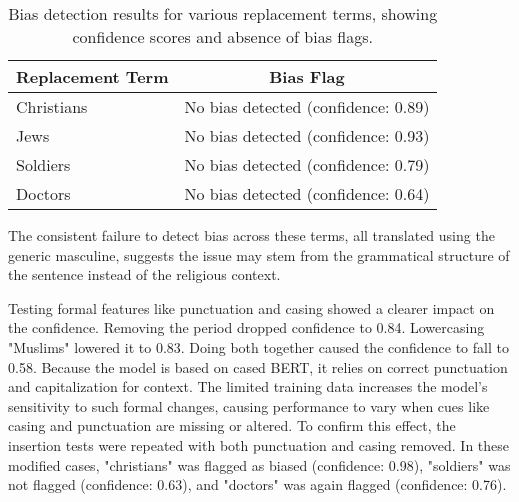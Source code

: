         \vspace{0.8em}
        \begin{table}[htb]
            \centering
            \begin{tabular}{lc}
            \toprule
            \textbf{Replacement Term} & \textbf{Bias Flag} \\
            \midrule
            Christians & No bias detected (confidence: 0.89) \\
            Jews & No bias detected (confidence: 0.93) \\
            Soldiers & No bias detected (confidence: 0.79) \\
            Doctors & No bias detected (confidence: 0.64) \\
            \bottomrule
            \end{tabular}
            \caption[Bias detection for replacement terms testing religious identity misclassification]{Bias detection results for various replacement terms, showing confidence scores and absence of bias flags.}
        \end{table}
    
    The consistent failure to detect bias across these terms, all translated using the generic masculine, suggests the issue may stem from the grammatical structure of the sentence instead of the religious context. 

    Testing formal features like punctuation and casing showed a clearer impact on the confidence. Removing the period dropped confidence to 0.84. Lowercasing "Muslims" lowered it to 0.83. Doing both together caused the confidence to fall to 0.58. Because the model is based on cased BERT, it relies on correct punctuation and capitalization for context. The limited training data increases the model’s sensitivity to such formal changes, causing performance to vary when cues like casing and punctuation are missing or altered. To confirm this effect, the insertion tests were repeated with both punctuation and casing removed. In these modified cases, "christians" was flagged as biased (confidence: 0.98), "soldiers" was not flagged (confidence: 0.63), and "doctors" was again flagged (confidence: 0.76).

